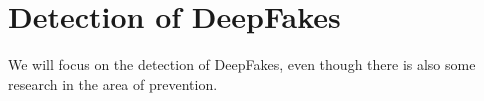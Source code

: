 \section{Detection of DeepFakes}
We will focus on the detection of DeepFakes, even though there is also some research in the area of
prevention.
